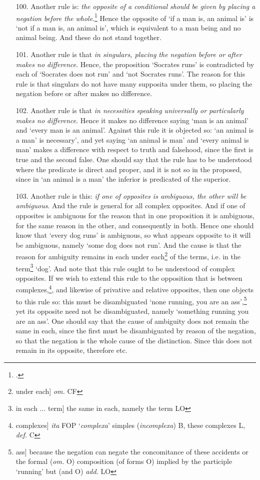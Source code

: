 \begin{itemize}
\item[100.] Another rule is: \textit{the opposite of a conditional should be given by placing a negation before the whole}.\footnote{\cite[p. 209.16]{BurleyDPAL}.} Hence the opposite of `if a man is, an animal is' is `not if a man is, an animal is', which is equivalent to a man being and no animal being. And these do not stand together.
\item[101.] Another rule is that \textit{in singulars, placing the negation before or after makes no difference}. Hence, the proposition `Socrates runs' is contradicted by each of `Socrates does not run' and `not Socrates runs'. The reason for this rule is that singulars do not have many supposita under them, so placing the negation before or after makes no difference.
\item[102.] Another rule is that \textit{in necessities speaking universally or particularly makes no difference}. Hence it makes no difference saying `man is an animal' and `every man is an animal'. Against this rule it is objected so: `an animal is a man' is necessary', and yet saying `an animal is man' and `every animal is man' makes a difference with respect to truth and falsehood, since the first is true and the second false. One should say that the rule has to be understood where the predicate is direct and proper, and it is not so in the proposed, since in `an animal is a man' the inferior is predicated of the superior.
\item[103.] Another rule is this: \textit{if one of opposites is ambiguous, the other will be ambiguous}. And the rule is general for all complex opposites. And if one of opposites is ambiguous for the reason that in one proposition it is ambiguous, for the same reason in the other, and consequently in both. Hence one should know that `every dog runs' is ambiguous, so what appears opposite to it will be ambiguous, namely `some dog does not run'. And the cause is that the reason for ambiguity remains in each under each\footnote{under each] \textit{om.} CF} of the terms, i.e. in the term\footnote{in each ... term] the same in each, namely the term LO} `dog'. And note that this rule ought to be understood of complex opposites. If we wish to extend this rule to the opposition that is between complexes,\footnote{complexes] \textit{ita} FOP `\textit{complexa}' simples (\textit{incomplexa}) B, these complexes L, \textit{def.} C}, and likewise of privative and relative opposites, then one objects to this rule so: this must be disambiguated `none running, you are an ass',\footnote{ass] because the negation can negate the concomitance of these accidents or the formal (\textit{om.} O) composition (of forms O) implied by the participle `running' but (and O) \textit{add.} LO} yet its opposite need not be disambiguated, namely `something running you are an ass'. One should say that the cause of ambiguity does not remain the same in each, since the first must be disambiguated by reason of the negation, so that the negation is the whole cause of the distinction. Since this does not remain in its opposite, therefore etc.

\end{itemize}
